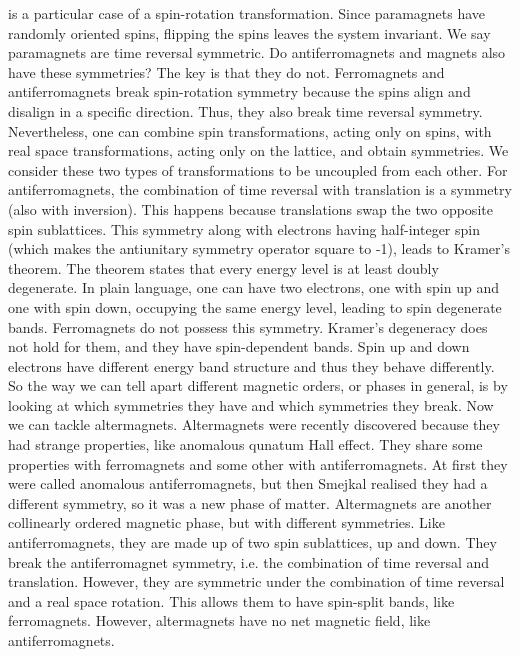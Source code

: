 \documentclass[11pt, a4paper]{article} %
\begin{document}
is a particular case of a spin-rotation transformation.
Since paramagnets have randomly oriented spins, flipping the spins leaves the system invariant. We say paramagnets are time reversal symmetric.
Do antiferromagnets and magnets also have these symmetries? The key is that they do not. 
Ferromagnets and antiferromagnets break spin-rotation symmetry because the spins align and disalign in a specific direction. Thus, they also 
break time reversal symmetry. Nevertheless, one can combine spin transformations, acting only on spins, with real space transformations, 
acting only on the lattice, and obtain symmetries. We consider these two types of transformations to be uncoupled from each other.
For antiferromagnets, the combination of time reversal with translation is a symmetry (also with inversion). 
This happens because translations swap the two opposite spin sublattices. 
This symmetry along with electrons having half-integer spin 
(which makes the antiunitary symmetry operator square to -1), leads to Kramer's theorem.  
The theorem states that every energy level is at least doubly degenerate. 
In plain language, one can have two electrons, one with spin up 
and one with spin down, occupying the same energy level, leading to spin degenerate bands. Ferromagnets do not possess this symmetry. 
Kramer's degeneracy does not hold for them, and they have spin-dependent bands. Spin up and down electrons have different 
energy band structure and thus they behave differently. 
So the way we can tell apart different magnetic orders, or phases in general, 
is by looking at which symmetries they have and which symmetries they break.
Now we can tackle altermagnets. Altermagnets were recently discovered because they had strange properties, like anomalous qunatum Hall effect. 
They share some properties with ferromagnets and some 
other with antiferromagnets. At first they were called anomalous antiferromagnets, but then 
Smejkal \cite{smejkal2022} realised they had a different symmetry, 
so it was a new phase of matter. Altermagnets are another collinearly ordered magnetic phase, but with different symmetries.
Like antiferromagnets, they are made up of two spin sublattices, up and down.
They break the antiferromagnet symmetry, i.e. the combination of time reversal and translation. However, they are
symmetric under the combination of time reversal and a real space rotation. 
This allows them to have spin-split bands, like ferromagnets. However, altermagnets have no net magnetic field, like antiferromagnets.  
\end{document}
